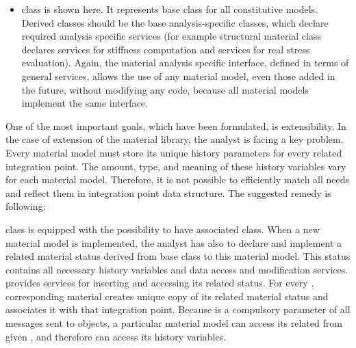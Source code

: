 \begin{htmlonly}
\begin{center}
\begin{itemize}
\item
{} class is shown here. It represents base class for all
constitutive models. Derived classes should be the base
analysis-specific classes, which declare required analysis
specific services (for example structural material class declares
services for stiffness computation and services for real stress
evaluation). Again, the material analysis specific interface, defined
in terms of general services, allows the use of any material model, even
those added in the future, without modifying any code, because all material
models implement the same interface.
\end{itemize}

One of the most important goals, which have been formulated, is
extensibility. In the case of extension of the material library, the
analyst is facing  a key problem. Every material model must store
its unique history parameters for every related integration point. The
amount, type, and meaning of these history variables vary for each
material model. Therefore, it is not possible to efficiently
match all needs and reflect them in integration point data
structure. The suggested remedy is following:

  class is equipped with the possibility to have
associated  class. When a new material model is
implemented, the analyst has also to declare and implement a related
material status derived from base
 class to this material model. This status contains all necessary
history variables and data access and modification
services.  provides services for inserting and
accessing its related status. For every  ,
corresponding material creates unique copy of its related material
status and associates it with that integration point. Because
 is a compulsory parameter of all messages sent to
 objects, a particular material model can access its
related  from given , and therefore can access its
history variables. 





\end{center}
\end{htmlonly}
